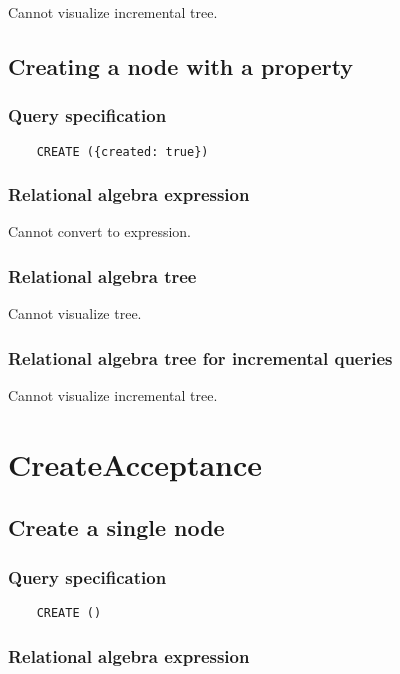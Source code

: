 	Cannot visualize incremental tree.
	\subsection{Creating a node with a property}

	\subsubsection*{Query specification}

	\begin{lstlisting}
	CREATE ({created: true})
	\end{lstlisting}


	\subsubsection*{Relational algebra expression}

	Cannot convert to expression.

	\subsubsection*{Relational algebra tree}

	Cannot visualize tree.

	\subsubsection*{Relational algebra tree for incremental queries}

	Cannot visualize incremental tree.

	\section{CreateAcceptance}

	\subsection{Create a single node}

	\subsubsection*{Query specification}

	\begin{lstlisting}
	CREATE ()
	\end{lstlisting}


	\subsubsection*{Relational algebra expression}

